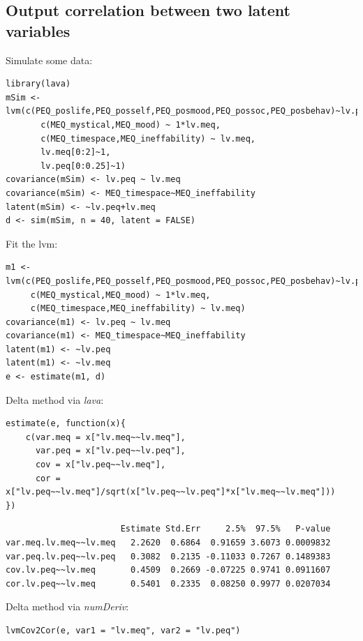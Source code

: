 \documentclass{article}
\begin{document}
\subsection{Output correlation between two latent variables}
\label{sec:org21a78ca}

Simulate some data:
\lstset{language=r,label= ,caption= ,captionpos=b,numbers=none}
\begin{lstlisting}
library(lava)
mSim <-lvm(c(PEQ_poslife,PEQ_posself,PEQ_posmood,PEQ_possoc,PEQ_posbehav)~lv.peq,
	   c(MEQ_mystical,MEQ_mood) ~ 1*lv.meq,
	   c(MEQ_timespace,MEQ_ineffability) ~ lv.meq,
	   lv.meq[0:2]~1,
	   lv.peq[0:0.25]~1)
covariance(mSim) <- lv.peq ~ lv.meq
covariance(mSim) <- MEQ_timespace~MEQ_ineffability
latent(mSim) <- ~lv.peq+lv.meq
d <- sim(mSim, n = 40, latent = FALSE)
\end{lstlisting}

Fit the lvm:
\lstset{language=r,label= ,caption= ,captionpos=b,numbers=none}
\begin{lstlisting}
m1 <-lvm(c(PEQ_poslife,PEQ_posself,PEQ_posmood,PEQ_possoc,PEQ_posbehav)~lv.peq,
	 c(MEQ_mystical,MEQ_mood) ~ 1*lv.meq,
	 c(MEQ_timespace,MEQ_ineffability) ~ lv.meq)
covariance(m1) <- lv.peq ~ lv.meq
covariance(m1) <- MEQ_timespace~MEQ_ineffability
latent(m1) <- ~lv.peq
latent(m1) <- ~lv.meq
e <- estimate(m1, d)
\end{lstlisting}

Delta method via \emph{lava}:
\lstset{language=r,label= ,caption= ,captionpos=b,numbers=none}
\begin{lstlisting}
estimate(e, function(x){
    c(var.meq = x["lv.meq~~lv.meq"],
      var.peq = x["lv.peq~~lv.peq"],
      cov = x["lv.peq~~lv.meq"],
      cor = x["lv.peq~~lv.meq"]/sqrt(x["lv.peq~~lv.peq"]*x["lv.meq~~lv.meq"]))
})
\end{lstlisting}

\begin{verbatim}
                       Estimate Std.Err     2.5%  97.5%   P-value
var.meq.lv.meq~~lv.meq   2.2620  0.6864  0.91659 3.6073 0.0009832
var.peq.lv.peq~~lv.peq   0.3082  0.2135 -0.11033 0.7267 0.1489383
cov.lv.peq~~lv.meq       0.4509  0.2669 -0.07225 0.9741 0.0911607
cor.lv.peq~~lv.meq       0.5401  0.2335  0.08250 0.9977 0.0207034
\end{verbatim}

Delta method via \emph{numDeriv}:
\lstset{language=r,label= ,caption= ,captionpos=b,numbers=none}
\begin{lstlisting}
lvmCov2Cor(e, var1 = "lv.meq", var2 = "lv.peq")
\end{lstlisting}
\end{document}
